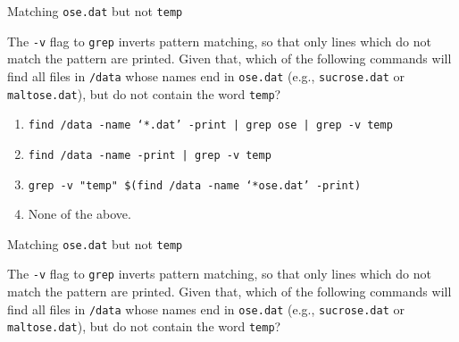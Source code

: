 \documentclass{beamer}
\begin{document}
\begin{frame}{Matching \texttt{ose.dat} but not \texttt{temp}}

The \texttt{-v} flag to \texttt{grep} inverts pattern matching, so that only lines which do not match the pattern are printed. Given that, which of the following commands will find all files in \texttt{/data} whose names end in \texttt{ose.dat} (e.g., \texttt{sucrose.dat} or \texttt{maltose.dat}), but do not contain the word \texttt{temp}?


\begin{enumerate}

\item{\texttt{find /data -name `*.dat' -print | grep ose | grep -v temp}}
\item{\texttt{find /data -name  -print | grep -v temp}}
\item{\texttt{grep -v "temp" \$(find /data -name `*ose.dat' -print)}}
\item{None of the above.}

\end{enumerate}

\end{frame}


\begin{frame}{Matching \texttt{ose.dat} but not \texttt{temp}}

The \texttt{-v} flag to \texttt{grep} inverts pattern matching, so that only lines which do not match the pattern are printed. Given that, which of the following commands will find all files in \texttt{/data} whose names end in \texttt{ose.dat} (e.g., \texttt{sucrose.dat} or \texttt{maltose.dat}), but do not contain the word \texttt{temp}?



\end{frame}

\end{document}
